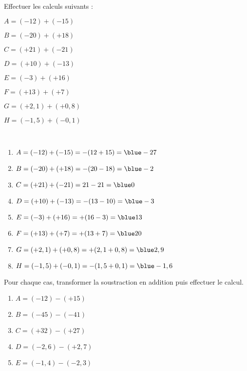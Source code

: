 \begin{colonne*exercice}


\begin{exercice} %
   Effectuer les calculs suivants :
   \begin{colenumerate}{2}
      \item $A =(-12)+(-15)$
      \item $B =(-20)+(+18)$
      \item $C =(+21)+(-21)$
      \item $D =(+10)+(-13)$
      \item $E =(-3)+(+16)$
      \item $F =(+13)+(+7)$
      \item $G =(+2,1)+(+0,8)$
      \item $H =(-1,5)+(-0,1)$
   \end{colenumerate}
\end{exercice}

\begin{corrige}
   \ \\ [-5mm]
   \begin{enumerate}
      \item $A =(-12)+(-15) =-(12+15) ={\blue -27}$ \smallskip
      \item $B =(-20)+(+18) =-(20-18) ={\blue -2}$ \smallskip
      \item $C =(+21)+(-21) =21-21 ={\blue 0}$ \smallskip
      \item $D =(+10)+(-13) =-(13-10) ={\blue -3}$ \smallskip
      \item $E =(-3)+(+16) =+(16-3) ={\blue 13}$ \smallskip
      \item $F =(+13)+(+7) =+(13+7) ={\blue 20}$ \smallskip
      \item $G =(+2,1)+(+0,8) =+(2,1+0,8) ={\blue 2,9}$ \smallskip
      \item $H =(-1,5)+(-0,1) =-(1,5+0,1) ={\blue -1,6}$
   \end{enumerate}
\end{corrige}

\medskip


\begin{exercice} %
   Pour chaque cas, transformer la soustraction en addition puis effectuer le calcul.
   \begin{enumerate}
      \item $A =(-12)-(+15)$
      \item $B =(-45)-(-41)$
      \item $C =(+32)-(+27)$
      \item $D =(-2,6)-(+2,7)$
      \item $E =(-1,4)-(-2,3)$
   \end{enumerate}
\end{exercice}


\end{colonne*exercice}
